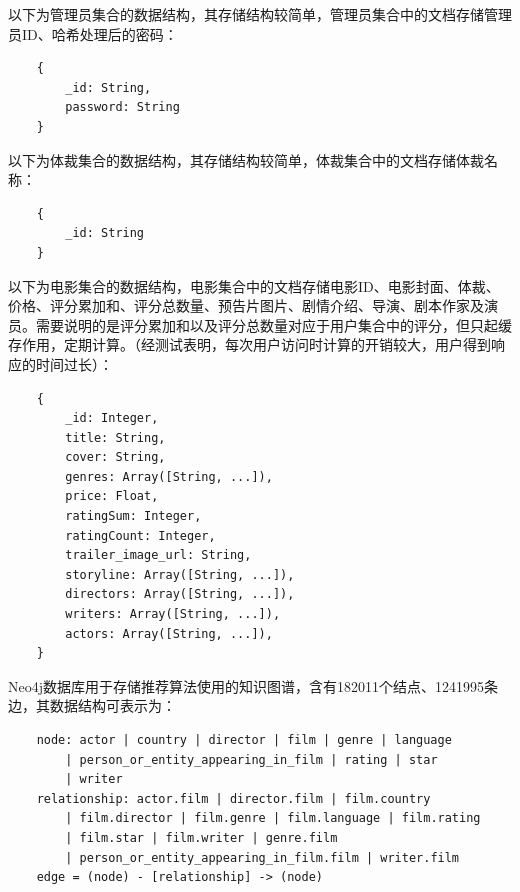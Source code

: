 \documentclass{bjfuthesis}
\begin{document}
以下为管理员集合的数据结构，其存储结构较简单，管理员集合中的文档存储管理员ID、哈希处理后的密码：
\begin{verbatim}
    {
        _id: String,
        password: String
    }
\end{verbatim}

以下为体裁集合的数据结构，其存储结构较简单，体裁集合中的文档存储体裁名称：
\begin{verbatim}
    {
        _id: String
    }
\end{verbatim}

以下为电影集合的数据结构，电影集合中的文档存储电影ID、电影封面、体裁、价格、评分累加和、评分总数量、预告片图片、剧情介绍、导演、剧本作家及演员。需要说明的是评分累加和以及评分总数量对应于用户集合中的评分，但只起缓存作用，定期计算。（经测试表明，每次用户访问时计算的开销较大，用户得到响应的时间过长）：
\begin{verbatim}
    {
        _id: Integer,
        title: String,
        cover: String,
        genres: Array([String, ...]),
        price: Float,
        ratingSum: Integer,
        ratingCount: Integer,
        trailer_image_url: String,
        storyline: Array([String, ...]),
        directors: Array([String, ...]),
        writers: Array([String, ...]),
        actors: Array([String, ...]),
    }
\end{verbatim}

Neo4j数据库用于存储推荐算法使用的知识图谱，含有182011个结点、1241995条边，其数据结构可表示为：
\begin{verbatim}
    node: actor | country | director | film | genre | language
        | person_or_entity_appearing_in_film | rating | star
        | writer
    relationship: actor.film | director.film | film.country
        | film.director | film.genre | film.language | film.rating
        | film.star | film.writer | genre.film
        | person_or_entity_appearing_in_film.film | writer.film
    edge = (node) - [relationship] -> (node)
\end{verbatim}
\end{document}
